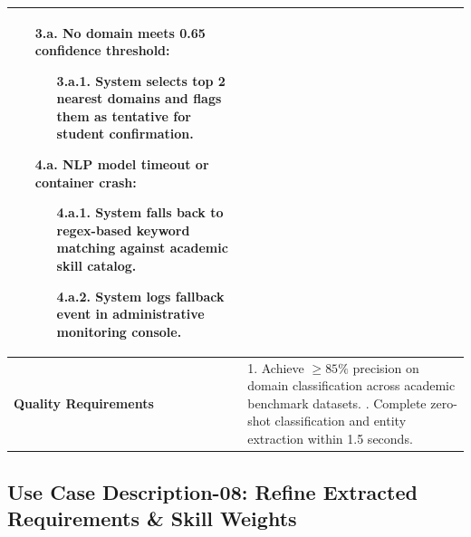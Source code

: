 \begin{table}[H]
\begin{tabularx}{\textwidth}{|l|X|}
\begin{itemize}[leftmargin=*]
    \item[\textbf{3.a.}] \textbf{No domain meets 0.65 confidence threshold:}
    \begin{itemize}[leftmargin=*]
        \item[3.a.1.] System selects top 2 nearest domains and flags them as tentative for student confirmation.
    \end{itemize}
    \item[\textbf{4.a.}] \textbf{NLP model timeout or container crash:}
    \begin{itemize}[leftmargin=*]
        \item[4.a.1.] System falls back to regex-based keyword matching against academic skill catalog.
        \item[4.a.2.] System logs fallback event in administrative monitoring console.
    \end{itemize}
\end{itemize} \\ \hline
\textbf{Quality Requirements} & 
1. Achieve $\ge 85\%$ precision on domain classification across academic benchmark datasets. \newline
2. Complete zero-shot classification and entity extraction within 1.5 seconds. \\ \hline
\end{tabularx}
\end{table}

\clearpage
\subsection{Use Case Description-08: Refine Extracted Requirements \& Skill Weights}
\label{subsec:uc08}

